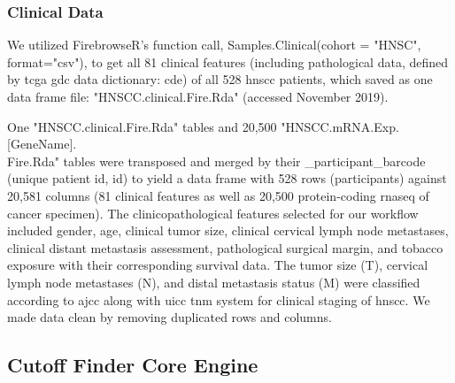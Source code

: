 \documentclass[jpm,article,submit,moreauthors,pdftex]{Definitions/mdpi}
\begin{document}
\begin{paracol}{2}
\subsubsection{Clinical Data} 

We utilized FirebrowseR's function call, Samples.Clinical(cohort = "HNSC", format="csv"), to get all 81 clinical features (including pathological data, defined by \acrshort{tcga} \acrshort{gdc} data dictionary: \acrfull{cde}\cite{CDE2019}) of all 528 \acrshort{hnscc} patients, which saved as one data frame file: "HNSCC.clinical.Fire.Rda" (accessed November 2019).

One "HNSCC.clinical.Fire.Rda" tables and 20,500 "HNSCC.mRNA.Exp.[GeneName].\\
Fire.Rda" tables were transposed and merged by their \_participant\_barcode (unique patient \acrlong{id}, \acrshort{id}) to yield a data frame with 528 rows (participants) against 20,581 columns (81 clinical features as well as 20,500 protein-coding \acrshort{rnaseq} of cancer specimen).
The clinicopathological features selected for our workflow included gender, age, clinical tumor size, clinical cervical lymph node metastases, clinical distant metastasis assessment, pathological surgical margin, and tobacco exposure with their corresponding survival data.
The tumor size (T), cervical lymph node metastases (N), and distal metastasis status (M) were classified according to \acrfull{ajcc}\cite{Amin2017} along with \acrfull{uicc}\cite{Brierley2016} \acrshort{tnm} system for clinical staging of \acrshort{hnscc}.
We made data clean by removing duplicated rows and columns.


\subsection{Cutoff Finder Core Engine}



\end{paracol}
\end{document}
